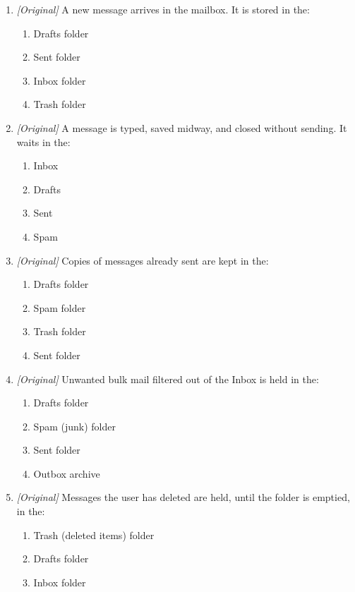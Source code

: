 \documentclass[11pt]{article}
\begin{document}
\begin{enumerate}[label=\textbf{Q\arabic*.}, leftmargin=*]
\begin{enumerate}[label=\Alph*.]
    \item Bcc recipients do not receive the message; they only receive a notification.
  \end{enumerate}
\item \textit{[Original]} A new message arrives in the mailbox. It is stored in the:
  \begin{enumerate}[label=\Alph*.]
    \item Drafts folder
    \item Sent folder
    \item Inbox folder
    \item Trash folder
  \end{enumerate}
\item \textit{[Original]} A message is typed, saved midway, and closed without sending. It waits in the:
  \begin{enumerate}[label=\Alph*.]
    \item Inbox
    \item Drafts
    \item Sent
    \item Spam
  \end{enumerate}
\item \textit{[Original]} Copies of messages already sent are kept in the:
  \begin{enumerate}[label=\Alph*.]
    \item Drafts folder
    \item Spam folder
    \item Trash folder
    \item Sent folder
  \end{enumerate}
\item \textit{[Original]} Unwanted bulk mail filtered out of the Inbox is held in the:
  \begin{enumerate}[label=\Alph*.]
    \item Drafts folder
    \item Spam (junk) folder
    \item Sent folder
    \item Outbox archive
  \end{enumerate}
\item \textit{[Original]} Messages the user has deleted are held, until the folder is emptied, in the:
  \begin{enumerate}[label=\Alph*.]
    \item Trash (deleted items) folder
    \item Drafts folder
    \item Inbox folder

\end{enumerate}
\end{enumerate}
\end{document}
